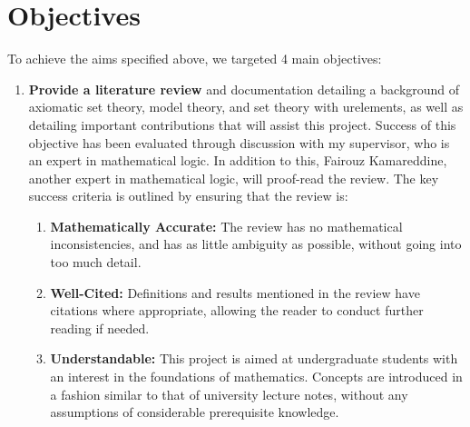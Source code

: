 \documentclass[11pt]{report}
\theoremstyle{definition}
\theoremstyle{theorem}
\theoremstyle{lemma}
\begin{document}
\section{Objectives}
To achieve the aims specified above, we targeted 4 main objectives:
\begin{enumerate}
  \item \textbf{Provide a literature review} and documentation detailing a background of axiomatic set theory, model theory, and set theory with urelements, as well as detailing important contributions that will assist this project.
  Success of this objective has been evaluated through discussion with my supervisor, who is an expert in mathematical logic.
  In addition to this, Fairouz Kamareddine, another expert in mathematical logic, will proof-read the review.  
  The key success criteria is outlined by ensuring that the review is:
  \begin{enumerate}
    \item \textbf{Mathematically Accurate:} The review has no mathematical inconsistencies, and has as little ambiguity as possible, without going into too much detail. 
    \item \textbf{Well-Cited:} Definitions and results mentioned in the review have citations where appropriate, allowing the reader to conduct further reading if needed. 
    \item \textbf{Understandable:} This project is aimed at undergraduate students with an interest in the foundations of mathematics. Concepts are introduced in a fashion similar to that of university lecture notes, without any assumptions of considerable prerequisite knowledge. 
  \end{enumerate} 


\end{enumerate}
\end{document}
